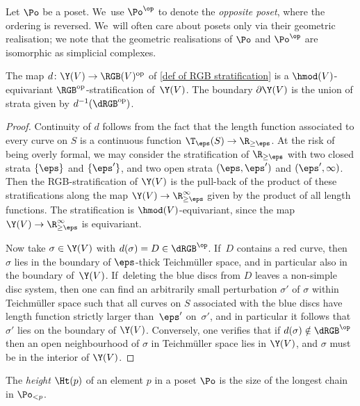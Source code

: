 \begin{defn}Let $\Po$ be a poset. We~use $\Po^\op$ to denote the \emph{opposite poset}, where the ordering is reversed. We~will often care about posets only via their geometric realisation; we note that the geometric realisations of $\Po$ and $\Po^\op$ are isomorphic as simplicial complexes.
\end{defn}

\begin{thm}\label{thm:combinatorial model}
The map $d \colon \Y(V) \to \RGB(V)^\textnormal{op}$ of \cref{def of RGB stratification} is a $\hmod(V)$-equivariant $\RGB^\textnormal{op}$-stratification of $\,\Y(V)$. The boundary $\partial \Y(V)$ is the union of strata given by $d^{-1}(\dRGB^\textnormal{op})$.
\end{thm}

\begin{proof}Continuity of $d$ follows from the fact that the length function associated to every curve on $S$ is a continuous function $\T_\eps(S)\to \R_{\geq \eps}$. At the risk of being overly formal, we may consider the stratification of $\R_{\geq \eps}$ with two closed strata $\{\eps\}$ and $\{\eps'\}$, and two open strata $(\eps,\eps')$ and $(\eps',\infty)$. Then the RGB-stratification of $\Y(V)$ is the pull-back of the product of these stratifications along the map $\Y(V) \to \R_{\geq \eps}^\infty$ given by the product of all length functions. The stratification is $\hmod(V)$-equivariant, since the map $\Y(V) \to \R_{\geq \eps}^\infty$ is equivariant.

Now take $\sigma \in \Y(V)$ with $d(\sigma)=D\in \dRGB^\op$. If~$D$ contains a red curve, then~$\sigma$ lies in the boundary of $\eps$-thick Teichmüller space, and in particular also in the boundary of~$\Y(V)$. If~deleting the blue discs from $D$ leaves a non-simple disc system, then one can find an arbitrarily small perturbation $\sigma'$ of $\sigma$ within Teichmüller space such that all curves on $S$ associated with the blue discs have length function strictly larger than~$\eps'$ on~$\sigma'$, and in particular it follows that $\sigma'$ lies on the boundary of $\Y(V)$. Conversely, one verifies that if $d(\sigma) \notin \dRGB^\op$ then an open neighbourhood of $\sigma$ in Teichmüller space lies in $\Y(V)$, and $\sigma$ must be in the interior of $\Y(V)$.
\end{proof}

\begin{defn}\label{ht of element}
The \emph{height} $\Ht(p)$ of an element $p$ in a poset $\Po$ is the size of the longest chain in $\Po_{<p}$.
\end{defn}

